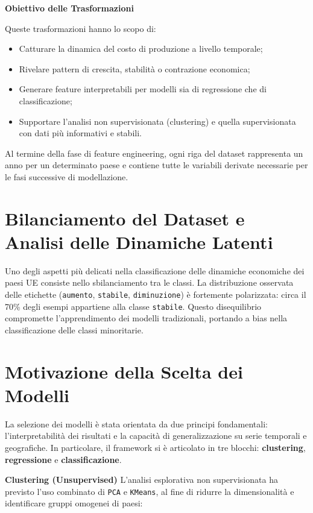 \documentclass[conference]{IEEEtran}
\begin{document}
\vspace{1em}\noindent\textbf{Obiettivo delle Trasformazioni}

Queste trasformazioni hanno lo scopo di:

\begin{itemize}
    \item Catturare la dinamica del costo di produzione a livello temporale;
    \item Rivelare pattern di crescita, stabilità o contrazione economica;
    \item Generare feature interpretabili per modelli sia di regressione che di classificazione;
    \item Supportare l’analisi non supervisionata (clustering) e quella supervisionata con dati più informativi e stabili.
\end{itemize}

Al termine della fase di feature engineering, ogni riga del dataset rappresenta un anno per un determinato paese e contiene tutte le variabili derivate necessarie per le fasi successive di modellazione.


 \section*{\Large \textbf{Bilanciamento del Dataset e Analisi delle Dinamiche Latenti}}
Uno degli aspetti più delicati nella classificazione delle dinamiche economiche dei paesi UE consiste nello sbilanciamento tra le classi. La distribuzione osservata delle etichette (\texttt{aumento}, \texttt{stabile}, \texttt{diminuzione}) è fortemente polarizzata: circa il 70\% degli esempi appartiene alla classe \texttt{stabile}. Questo disequilibrio compromette l'apprendimento dei modelli tradizionali, portando a bias nella classificazione delle classi minoritarie.

\section*{\Large \textbf{Motivazione della Scelta dei Modelli}}
La selezione dei modelli è stata orientata da due principi fondamentali: l’interpretabilità dei risultati e la capacità di generalizzazione su serie temporali e geografiche. In particolare, il framework si è articolato in tre blocchi: \textbf{clustering}, \textbf{regressione} e \textbf{classificazione}.

\vspace{0.5em} \noindent\textbf{Clustering (Unsupervised)} L’analisi esplorativa non supervisionata ha previsto l’uso combinato di \texttt{PCA} e \texttt{KMeans}, al fine di ridurre la dimensionalità e identificare gruppi omogenei di paesi:
\end{document}
